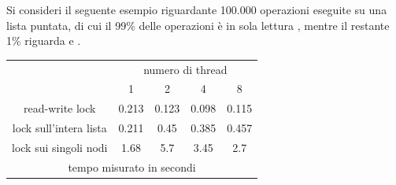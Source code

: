 \documentclass[10pt, letterpaper]{report}
\begin{document}
Si consideri il seguente esempio riguardante 100.000 operazioni eseguite su una lista puntata, di cui il 99\% delle operazioni è in sola lettura , mentre il restante 1\% riguarda  e .\begin{center}
    \begin{tabular}{ccccc}
        \cline{2-5}
        \multicolumn{1}{c|}{}                                                & \multicolumn{4}{c|}{\cellcolor[HTML]{ECF4FF}numero di thread}                                                                                                                                         \\ \cline{2-5} 
        \multicolumn{1}{c|}{}                                                & \multicolumn{1}{c|}{\cellcolor[HTML]{ECF4FF}1}     & \multicolumn{1}{c|}{\cellcolor[HTML]{ECF4FF}2} & \multicolumn{1}{c|}{\cellcolor[HTML]{ECF4FF}4} & \multicolumn{1}{c|}{\cellcolor[HTML]{ECF4FF}8} \\ \hline
        \multicolumn{1}{|c|}{\cellcolor[HTML]{FFDFB9}read-write lock}        & \multicolumn{1}{c|}{\cellcolor[HTML]{CDFCCD}0.213} & \multicolumn{1}{c|}{0.123}                     & \multicolumn{1}{c|}{0.098}                     & \multicolumn{1}{c|}{0.115}                     \\ \hline
        \multicolumn{1}{|c|}{\cellcolor[HTML]{FFDFB9}lock sull'intera lista} & \multicolumn{1}{c|}{\cellcolor[HTML]{CDFCCD}0.211} & \multicolumn{1}{c|}{0.45}                      & \multicolumn{1}{c|}{0.385}                     & \multicolumn{1}{c|}{0.457}                     \\ \hline
        \multicolumn{1}{|c|}{\cellcolor[HTML]{FFDFB9}lock sui singoli nodi}  & \multicolumn{1}{c|}{\cellcolor[HTML]{CDFCCD}1.68}  & \multicolumn{1}{c|}{5.7}                       & \multicolumn{1}{c|}{3.45}                      & \multicolumn{1}{c|}{2.7}                       \\ \hline
        \multicolumn{5}{c}{tempo misurato in secondi}                                                                                                                                                                                                                               
        \end{tabular}
\end{center}
\end{document}
